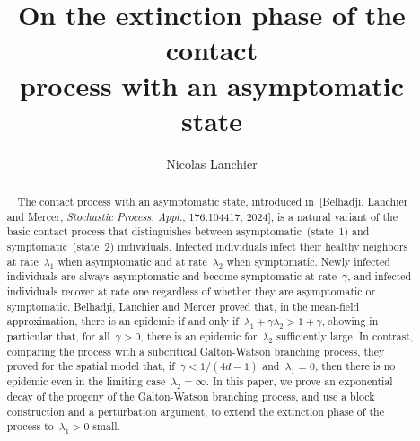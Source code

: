 \documentclass[letterpaper,11pt,twoside,keywordsasfootnote,addressatend,noinfoline]{article}
\begin{document}
\begin{frontmatter}
\title     {On the extinction phase of the contact \\ process with an asymptomatic state}
\author    {Nicolas Lanchier}
\address   {School of Mathematical and Statistical Sciences \\ Arizona State University, Tempe, AZ 85287, USA. \\ nicolas.lanchier@asu.edu}

\maketitle

\begin{abstract} \ \
 The contact process with an asymptomatic state, introduced in~[Belhadji, Lanchier and Mercer, \emph{Stochastic Process. Appl.}, 176:104417, 2024], is a natural variant of the basic contact process that distinguishes between asymptomatic~(state~1) and symptomatic~(state~2) individuals.
 Infected individuals infect their healthy neighbors at rate~$\lambda_1$ when asymptomatic and at rate~$\lambda_2$ when symptomatic.
 Newly infected individuals are always asymptomatic and become symptomatic at rate~$\gamma$, and infected individuals recover at rate one regardless of whether they are asymptomatic or symptomatic.
 Belhadji, Lanchier and Mercer proved that, in the mean-field approximation, there is an epidemic if and only if~$\lambda_1 + \gamma \lambda_2 > 1 + \gamma$, showing in particular that, for all~$\gamma > 0$, there is an epidemic for~$\lambda_2$ sufficiently large.
 In contrast, comparing the process with a subcritical Galton-Watson branching process, they proved for the spatial model that, if~$\gamma < 1 / (4d - 1)$ and~$\lambda_1 = 0$, then there is no epidemic even in the limiting case~$\lambda_2 = \infty$.
 In this paper, we prove an exponential decay of the progeny of the Galton-Watson branching process, and use a block construction and a perturbation argument, to extend the extinction phase of the process to~$\lambda_1 > 0$ small.
\end{abstract}

\begin{keyword}[class=AMS]
\end{keyword}

\begin{keyword}
\end{keyword}

\end{frontmatter}
\end{document}
